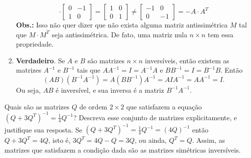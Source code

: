 \documentclass[12pt,a4paper]{article}
\begin{document}
\begin{ExerciseList}
\begin{enumerate}
\[\cdot
\begin{bmatrix}
0 & -1 \\ 1 & 0
\end{bmatrix}
=\begin{bmatrix}
1 & 0 \\ 0 & 1
\end{bmatrix}
\neq
\begin{bmatrix}
-1 & 0 \\ 0 & -1
\end{bmatrix}
=-A \cdot A^T
\]
\textbf{Obs.:} Isso não quer dizer que não exista alguma matriz antissimétrica $M$ tal que $M \cdot M^T$ seja antissimétrica. De fato, uma matriz nula $n \times n$ tem essa propriedade.

\item \textbf{Verdadeiro}. Se $A$ e $B$ são matrizes $n \times n$ inversíveis, então existem as matrizes $A^{-1}$ e $B^{-1}$ tais que $A A^{-1} = I =A^{-1} A$ e $B B^{-1} = I = B^{-1} B$. Então
\[
(AB) (B^{-1}A^{-1})
= A(B B^{-1})A^{-1}
= A I A^{-1}
= A A^{-1}
= I.
\]
Ou seja, $AB$ é inversível, e sua inversa é a matriz $B^{-1}A^{-1}$.
\end{enumerate}

\Exercise[title={2,5}]
Quais são as matrizes $Q$ de ordem $2 \times 2$ que satisfazem a equação $(Q + 3Q^T)^{-1} = \frac{1}{4}Q^{-1}$? Descreva esse conjunto de matrizes explicitamente, e justifique sua resposta.
\Answer Se $(Q + 3Q^T)^{-1} = \frac{1}{4}Q^{-1} = (4Q)^{-1}$ então $Q + 3Q^T = 4Q$, isto é, $3Q^T = 4Q - Q = 3Q$, ou ainda, $Q^T = Q$. Assim, as matrizes que satisfazem a condição dada são as matrizes simétricas inversíveis.


\end{ExerciseList}
\end{document}
